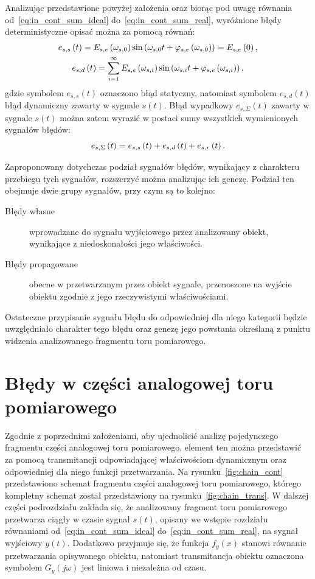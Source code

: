 Analizując przedstawione powyżej założenia oraz biorąc pod uwagę równania od~\eqref{eq:in_cont_sum_ideal} do~\eqref{eq:in_cont_sum_real}, wyróżnione błędy deterministyczne opisać można za pomocą równań:
\begin{gather}
e_{s,s} \left(t\right) = E_{s,e} \left(\omega_{s,0}\right) \sin \left( \omega_{s,0} t + \varphi_{s,e} \left(\omega_{s,0}\right) \right) = E_{s,e} \left(0\right) \label{eq:in_cont_err_stat}, \\
e_{s,d} \left(t\right) = \sum _{i = 1} ^{\infty} E_{s,e} \left(\omega_{s,i}\right) \sin \left( \omega_{s,i} t + \varphi_{s,e} \left(\omega_{s,i}\right) \right) \label{eq:in_cont_err_dyn},
\end{gather}
gdzie symbolem $e_{s,s}(t)$ oznaczono błąd statyczny, natomiast symbolem $e_{s,d}(t)$ błąd dynamiczny zawarty w sygnale $s(t)$. Błąd wypadkowy $e_{s,\Sigma}(t)$ zawarty w sygnale $s(t)$ można zatem wyrazić w postaci sumy wszystkich wymienionych sygnałów błędów:
\begin{equation}
e_{s,\Sigma} \left(t\right) = e_{s,s} \left(t\right) + e_{s,d} \left(t\right) + e_{s,r} \left(t\right) \label{eq:in_cont_err_sum}.
\end{equation}

Zaproponowany dotychczas podział sygnałów błędów, wynikający z charakteru przebiegu tych sygnałów, rozszerzyć można analizując ich genezę. Podział ten obejmuje dwie grupy sygnałów, przy czym są to kolejno:
\begin{description}
\item [Błędy własne] wprowadzane do sygnału wyjściowego przez analizowany obiekt, wynikające z niedoskonałości jego właściwości.
\item [Błędy propagowane] obecne w przetwarzanym przez obiekt sygnale, przenoszone na wyjście obiektu zgodnie z jego rzeczywistymi właściwościami.
\end{description}

Ostateczne przypisanie sygnału błędu do odpowiedniej dla niego kategorii będzie uwzględniało charakter tego błędu oraz genezę jego powstania określaną z punktu widzenia analizowanego fragmentu toru pomiarowego.

\section{Błędy w części analogowej toru pomiarowego}

Zgodnie z poprzednimi założeniami, aby ujednolicić analizę pojedynczego fragmentu części analogowej toru pomiarowego, element ten można przedstawić za pomocą transmitancji odpowiadającej właściwościom dynamicznym oraz odpowiedniej dla niego funkcji przetwarzania. Na rysunku~\ref{fig:chain_cont} przedstawiono schemat fragmentu części analogowej toru pomiarowego, którego kompletny schemat został przedstawiony na rysunku~\ref{fig:chain_trans}. W dalszej części podrozdziału zakłada się, że analizowany fragment toru pomiarowego przetwarza ciągły w czasie sygnał $s(t)$, opisany we wstępie rozdziału równaniami od~\eqref{eq:in_cont_sum_ideal} do~\eqref{eq:in_cont_sum_real}, na sygnał wyjściowy $y(t)$. Dodatkowo przyjmuje się, że funkcja $f_{y}(x)$ stanowi równanie przetwarzania opisywanego obiektu, natomiast transmitancja obiektu oznaczona symbolem $G_{y}(j\omega)$ jest liniowa i niezależna od czasu.

